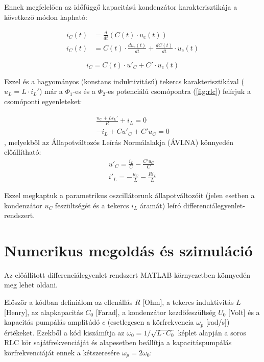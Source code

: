 \documentclass[12pt,a4paper]{article}
\begin{document}
Ennek megfelelően az időfüggő kapacitású kondenzátor karakterisztikája a következő módon kapható:

\begin{equation}
    \begin{split}
        i_C(t) & = \frac{d}{dt}(C(t) \cdot u_c(t)) \\
        i_C(t) & = C(t) \cdot \frac{du_c(t)}{dt} + \frac{dC(t)}{dt} \cdot u_c(t)
    \end{split}
\end{equation}

\begin{equation}
    \boxed{i_C = C(t) \cdot u'_C + C' \cdot u_c(t)}
\end{equation}

\pagebreak

Ezzel és a hagyományos (konstans induktivitású) tekercs karakterisztikával ($u_L = L \cdot i_L'$) már a $\Phi_1$-es és a $\Phi_2$-es potenciálú
csomópontra (\ref{fig:rlc}) felírjuk a csomóponti egyenleteket:

\begin{equation}
    \begin{split}
        \frac{u_C + Li_L'}{R} + i_L = 0 \\
        -i_L+Cu'_C + C'u_C = 0
    \end{split}
\end{equation}
, melyekből az Állapotváltozós Leírás Normálalakja (ÁVLNA) könnyedén előállítható:
\begin{equation}
    \boxed
    {
        \begin{split}
                u'_C = \frac{i_L}{C} - \frac{C'u_C}{C} \\
                i'_L = -\frac{u_C}{L} - \frac{Ri_L}{L}
        \end{split}
    }
    \label{avlna}
\end{equation}

Ezzel megkaptuk a parametrikus oszcillátorunk állapotváltozóit (jelen esetben a kondenzátor $u_C$ feszültségét és a tekercs $i_L$ áramát)
leíró differenciálegyenlet-rendszert.

\section{Numerikus megoldás és szimuláció}

Az előállított differenciálegyenlet rendszert MATLAB környezetben könnyedén meg lehet oldani.

Először a kódban definiálom az ellenállás $R$ [Ohm], a tekercs induktivitás $L$ [Henry], az alapkapacitás $C_0$ [Farad],
a kondenzátor kezdőfeszültség $U_0$ [Volt] és a kapacitás pumpálás amplitúdó $c$ (esetlegesen a körfrekvencia $\omega_p$ [rad/s]) értékeket.
Ezekből a kód kiszámítja az $\omega_0 = 1 / \sqrt{L \cdot C_0}$ képlet alapján a soros RLC kör sajátfrekvenciáját és alapesetben beállítja a kapacitáspumpálás körfrekvenciáját
ennek a kétszeresére $\omega_p = 2 \omega_0$:
\end{document}
